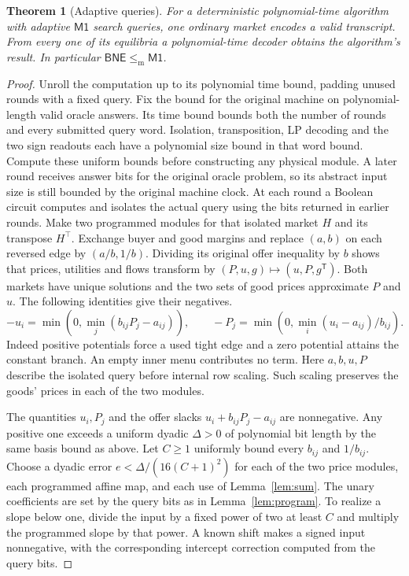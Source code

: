 \documentclass[11pt]{article}
\newtheorem{theorem}{Theorem}[section]
\newcommand{\Market}{\mathsf{M1}}
\newcommand{\BNE}{\mathsf{BNE}}
\newcommand{\dd}{\mathrel{\leq_{\mathrm m}}}
\begin{document}
\begin{theorem}[Adaptive queries]\label{thm:compile}
For a deterministic polynomial-time algorithm with adaptive \(\Market\)
search queries, one ordinary market encodes a valid transcript. From
every one of its equilibria a polynomial-time decoder obtains the
algorithm's result. In particular \(\BNE\dd\Market\).
\end{theorem}
\begin{proof}
Unroll the computation up to its polynomial time bound, padding unused
rounds with a fixed query. Fix the bound for the original machine on
polynomial-length valid oracle answers. Its time bound bounds both the
number of rounds and every submitted query word. Isolation, transposition,
LP decoding and the two sign readouts each have a polynomial size bound
in that word bound. Compute these uniform bounds before constructing any
physical module. A later round receives answer bits for the original
oracle problem, so its abstract input size is still bounded by the
original machine clock. At each round a Boolean circuit computes and
isolates the actual query using the bits returned in earlier rounds.
Make two programmed modules for that isolated market \(H\) and its
transpose \(H^\top\). Exchange buyer and good margins and replace
\((a,b)\) on each reversed edge by \((a/b,1/b)\). Dividing its original
offer inequality by \(b\) shows that prices, utilities and flows
transform by \((P,u,g)\mapsto(u,P,g^{\mathsf T})\). Both markets have
unique solutions and the two sets of good prices approximate \(P\) and \(u\). The
following identities give their negatives.
\[
 -u_i=\min(0,\min_j(b_{ij}P_j-a_{ij})),\qquad
 -P_j=\min(0,\min_i (u_i-a_{ij})/b_{ij}).
\]
Indeed positive potentials force a used tight edge and a zero potential
attains the constant branch. An empty inner menu contributes no term.
Here \(a,b,u,P\) describe the isolated query before internal row scaling.
Such scaling preserves the goods' prices in each of the two modules.

The quantities \(u_i,P_j\) and the offer slacks
\(u_i+b_{ij}P_j-a_{ij}\) are nonnegative. Any positive one exceeds a
uniform dyadic \(\Delta>0\) of polynomial bit length by the same basis
bound as above. Let \(C\ge1\) uniformly bound every \(b_{ij}\) and
\(1/b_{ij}\). Choose a dyadic error \(e<\Delta/(16(C+1)^2)\) for each
of the two price modules, each programmed affine map, and each use of
Lemma~\ref{lem:sum}. The unary coefficients are set by the query bits
as in Lemma~\ref{lem:program}. To realize a slope below one, divide the
input by a fixed power of two at least \(C\) and multiply the programmed
slope by that power. A known shift makes a signed input nonnegative,
with the corresponding intercept correction computed from the query bits.


\end{proof}
\end{document}
